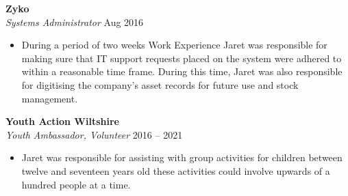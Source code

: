\noindent
\textbf{Zyko}\\
\textit{Systems Administrator} \hfill Aug 2016
\begin{itemize}
    \item During a period of two weeks Work Experience Jaret was responsible for making sure that IT support requests placed on the system were adhered to within a reasonable time frame. During this time, Jaret was also responsible for digitising the company’s asset records for future use and stock management.
\end{itemize}


\noindent
\textbf{Youth Action Wiltshire}\\
\textit{Youth Ambassador, Volunteer} \hfill 2016 – 2021
\begin{itemize}
    \item Jaret was responsible for assisting with group activities for children between twelve and seventeen years old these activities could involve upwards of a hundred people at a time.
\end{itemize}

